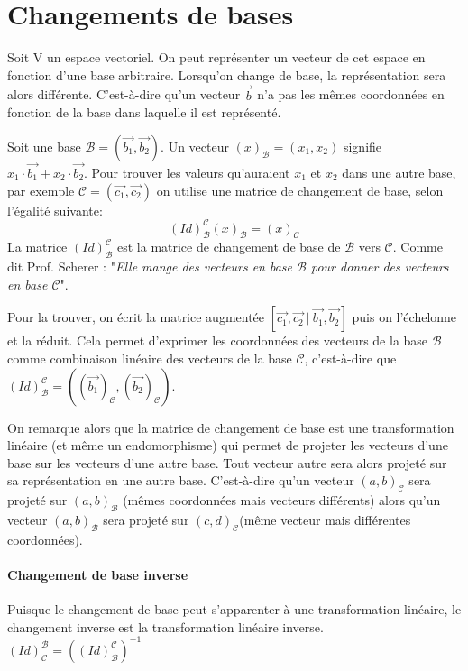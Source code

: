 \documentclass[10pt,a4paper]{book}
\begin{document}
\section{Changements de bases}
Soit V un espace vectoriel. On peut représenter un vecteur de cet espace en fonction d'une base arbitraire. Lorsqu'on change de base, la représentation sera alors différente. C'est-à-dire qu'un vecteur $\vec{b}$ n'a pas les mêmes coordonnées en fonction de la base dans laquelle il est représenté. \par 
Soit une base $\mathcal{B}=(\vec{b_1}, \vec{b_2})$. Un vecteur $(x)_{\mathcal{B}}=(x_1,x_2)$ signifie $x_1\cdot \vec{b_1}+x_2\cdot \vec{b_2}$. Pour trouver les valeurs qu'auraient $x_1$ et $x_2$ dans une autre base, par exemple $\mathcal{C}=(\vec{c_1}, \vec{c_2})$ on utilise une matrice de changement de base, selon l'égalité suivante: 
\[(Id)^{\mathcal{C}}_{\mathcal{B}} (x)_{\mathcal{B}} = (x)_{\mathcal{C}}\]
La matrice $(Id)^{\mathcal{C}}_{\mathcal{B}}$ est la matrice de changement de base de $\mathcal{B}$ vers $\mathcal{C}$. Comme dit Prof. Scherer : "\textit{Elle mange des vecteurs en base $\mathcal{B}$ pour donner des vecteurs en base $\mathcal{C}$}". \par 
Pour la trouver, on écrit la matrice augmentée $[\vec{c_1},\vec{c_2}\ |\ \vec{b_1},\vec{b_2}]$ puis on l'échelonne et la réduit. Cela permet d'exprimer les coordonnées des vecteurs de la base $\mathcal{B}$ comme combinaison linéaire des vecteurs de la base $\mathcal{C}$, c'est-à-dire que $(Id)^{\mathcal{C}}_{\mathcal{B}} = ((\vec{b_1})_{\mathcal{C}},(\vec{b_2})_{\mathcal{C}})$.\par 
On remarque alors que la matrice de changement de base est une transformation linéaire (et même un endomorphisme) qui permet de projeter les vecteurs d'une base sur les vecteurs d'une autre base. Tout vecteur autre sera alors projeté sur sa représentation en une autre base. C'est-à-dire qu'un vecteur $(a,b)_\mathcal{C}$ sera projeté sur $(a,b)_\mathcal{B}$ (mêmes coordonnées mais vecteurs différents) alors qu'un vecteur $(a,b)_\mathcal{B}$ sera projeté sur $(c,d)_\mathcal{C}$(même vecteur mais différentes coordonnées). 

\paragraph{Changement de base inverse}
Puisque le changement de base peut s'appa\-renter à une transformation linéaire, le changement inverse est la transformation linéaire inverse. $(Id)^{\mathcal{B}}_{\mathcal{C}} = ((Id)^{\mathcal{C}}_{\mathcal{B}})^{-1}$
\end{document}
